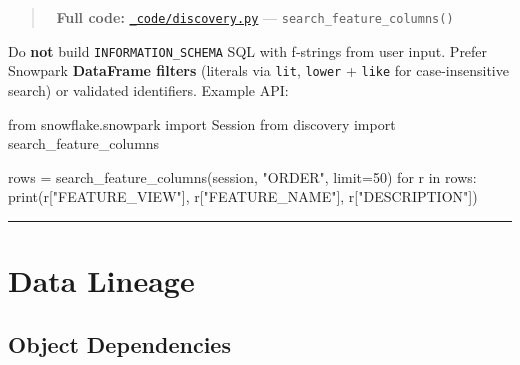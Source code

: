 \documentclass[
  letterpaper,
  DIV=11,
  numbers=noendperiod]{scrreprt}
\newenvironment{Shaded}{\begin{snugshade}}{\end{snugshade}}
\newcommand{\BuiltInTok}[1]{\textcolor[rgb]{0.00,0.23,0.31}{#1}}
\newcommand{\CommentTok}[1]{\textcolor[rgb]{0.37,0.37,0.37}{#1}}
\newcommand{\ControlFlowTok}[1]{\textcolor[rgb]{0.00,0.23,0.31}{#1}}
\newcommand{\DecValTok}[1]{\textcolor[rgb]{0.68,0.00,0.00}{#1}}
\newcommand{\ImportTok}[1]{\textcolor[rgb]{0.00,0.46,0.62}{#1}}
\newcommand{\KeywordTok}[1]{\textcolor[rgb]{0.00,0.23,0.31}{#1}}
\newcommand{\NormalTok}[1]{\textcolor[rgb]{0.00,0.23,0.31}{#1}}
\newcommand{\OperatorTok}[1]{\textcolor[rgb]{0.37,0.37,0.37}{#1}}
\newcommand{\StringTok}[1]{\textcolor[rgb]{0.13,0.47,0.30}{#1}}
\begin{document}
\begin{quote}
📁 \textbf{Full code:}
\href{_code/discovery.py}{\texttt{\_code/discovery.py}} ---
\texttt{search\_feature\_columns()}
\end{quote}

Do \textbf{not} build \texttt{INFORMATION\_SCHEMA} SQL with f-strings
from user input. Prefer Snowpark \textbf{DataFrame filters} (literals
via \texttt{lit}, \texttt{lower} + \texttt{like} for case-insensitive
search) or validated identifiers. Example API:

\begin{Shaded}
\begin{Highlighting}[]
\ImportTok{from}\NormalTok{ snowflake.snowpark }\ImportTok{import}\NormalTok{ Session}
\ImportTok{from}\NormalTok{ discovery }\ImportTok{import}\NormalTok{ search\_feature\_columns}

\NormalTok{rows }\OperatorTok{=}\NormalTok{ search\_feature\_columns(session, }\StringTok{"ORDER"}\NormalTok{, limit}\OperatorTok{=}\DecValTok{50}\NormalTok{)}
\ControlFlowTok{for}\NormalTok{ r }\KeywordTok{in}\NormalTok{ rows:}
    \BuiltInTok{print}\NormalTok{(r[}\StringTok{"FEATURE\_VIEW"}\NormalTok{], r[}\StringTok{"FEATURE\_NAME"}\NormalTok{], r[}\StringTok{"DESCRIPTION"}\NormalTok{])}
\end{Highlighting}
\end{Shaded}

\begin{center}\rule{0.5\linewidth}{0.5pt}\end{center}

\hypertarget{data-lineage}{%
\section{Data Lineage}\label{data-lineage}}

\hypertarget{object-dependencies}{%
\subsection{Object Dependencies}\label{object-dependencies}}

\begin{Shaded}
\end{Shaded}
\end{document}
